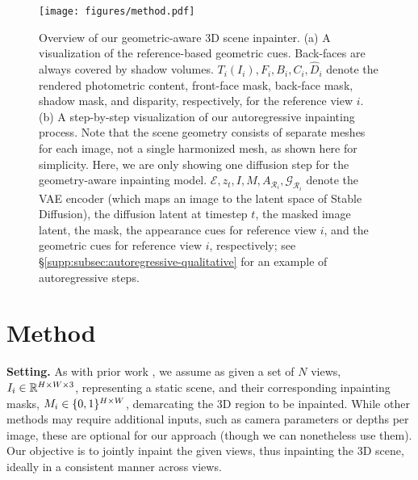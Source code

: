 \begin{figure*}[!ht]
    \centering
    \texttt{[image: figures/method.pdf]}
    \vspace{-20pt}
    \caption{
    Overview of our geometric-aware 3D scene inpainter.
    (a) A visualization of the reference-based geometric cues. Back-faces are always covered by shadow volumes. $T_i(I_i), F_i, B_i, C_i, \widehat{D}_i$ denote the rendered photometric content, front-face mask, back-face mask, shadow mask, and disparity, respectively, for the reference view $i$.
    (b) A step-by-step visualization of our autoregressive inpainting process. Note that the scene geometry consists of separate meshes for each image, not a single harmonized mesh, as shown here for 
    simplicity.
    Here, we are only showing one diffusion step for the geometry-aware inpainting model. $\mathcal{E}, z_t, I, M, A_{\mathcal{R}_i}, \mathcal{G}_{\mathcal{R}_i}$ denote the VAE encoder (which maps an image to the latent space of Stable Diffusion), the diffusion latent at timestep $t$, the masked image latent, the mask, the appearance cues for reference view $i$, and the geometric cues for reference view $i$, respectively; see \S\ref{supp:subsec:autoregressive-qualitative} for an example of autoregressive steps.
    }
    \vspace{-15pt}
    \label{fig:autoregressive}
\end{figure*}

\section{Method}
\label{sec:method}

\noindent\textbf{Setting.}
As with prior work \cite{spinnerf}, we assume as given 
a set of $N$ views, $I_i \in \mathbb{R}^{H \times W \times 3}$, representing a static scene, and 
their corresponding inpainting masks, $M_i \in \{0, 1\}^{H \times W}$, demarcating the 3D region to be inpainted.
While other methods may require additional inputs, such as camera parameters or depths per image, these are optional for our approach (though we can nonetheless use them).
Our objective is to jointly inpaint the given views, thus inpainting the 3D scene, ideally in a consistent manner across views.

